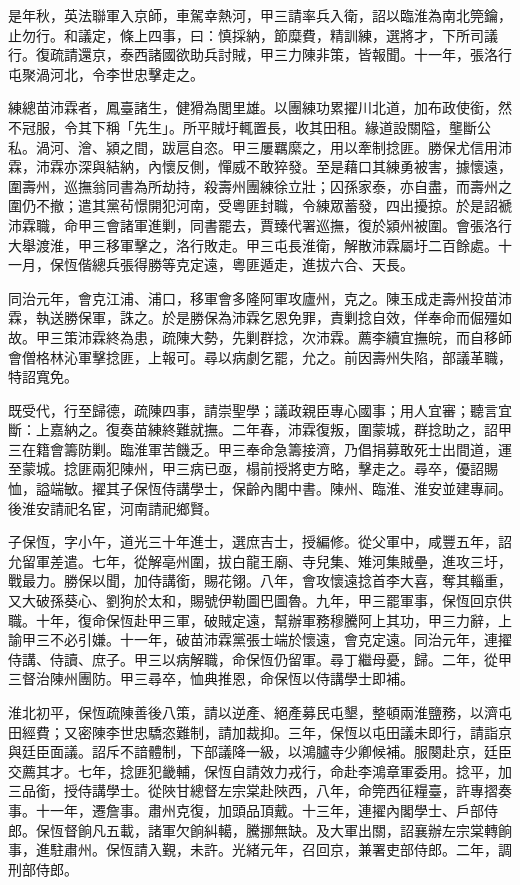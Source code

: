 \begin{pinyinscope}
是年秋，英法聯軍入京師，車駕幸熱河，甲三請率兵入衛，詔以臨淮為南北筦鑰，止勿行。和議定，條上四事，曰：慎採納，節糜費，精訓練，選將才，下所司議行。復疏請還京，泰西諸國欲助兵討賊，甲三力陳非策，皆報聞。十一年，張洛行屯聚渦河北，令李世忠擊走之。

練總苗沛霖者，鳳臺諸生，健猾為閭里雄。以團練功累擢川北道，加布政使銜，然不冠服，令其下稱「先生」。所平賊圩輒置長，收其田租。緣道設關隘，壟斷公私。渦河、澮、潁之間，跋扈自恣。甲三屢羈縻之，用以牽制捻匪。勝保尤信用沛霖，沛霖亦深與結納，內懷反側，憚威不敢猝發。至是藉口其練勇被害，據懷遠，圍壽州，巡撫翁同書為所劫持，殺壽州團練徐立壯；囚孫家泰，亦自盡，而壽州之圍仍不撤；遣其黨茍憬開犯河南，受粵匪封職，令練眾蓄發，四出擾掠。於是詔褫沛霖職，命甲三會諸軍進剿，同書罷去，賈臻代署巡撫，復於潁州被圍。會張洛行大舉渡淮，甲三移軍擊之，洛行敗走。甲三屯長淮衛，解散沛霖屬圩二百餘處。十一月，保恆偕總兵張得勝等克定遠，粵匪遁走，進拔六合、天長。

同治元年，會克江浦、浦口，移軍會多隆阿軍攻廬州，克之。陳玉成走壽州投苗沛霖，執送勝保軍，誅之。於是勝保為沛霖乞恩免罪，責剿捻自效，佯奉命而倔殭如故。甲三策沛霖終為患，疏陳大勢，先剿群捻，次沛霖。薦李續宜撫皖，而自移師會僧格林沁軍擊捻匪，上報可。尋以病劇乞罷，允之。前因壽州失陷，部議革職，特詔寬免。

既受代，行至歸德，疏陳四事，請崇聖學；議政親臣專心國事；用人宜審；聽言宜斷：上嘉納之。復奏苗練終難就撫。二年春，沛霖復叛，圍蒙城，群捻助之，詔甲三在籍會籌防剿。臨淮軍苦饑乏。甲三奉命急籌接濟，乃倡捐募敢死士出間道，運至蒙城。捻匪兩犯陳州，甲三病已亟，榻前授將吏方略，擊走之。尋卒，優詔賜恤，謚端敏。擢其子保恆侍講學士，保齡內閣中書。陳州、臨淮、淮安並建專祠。後淮安請祀名宦，河南請祀鄉賢。

子保恆，字小午，道光三十年進士，選庶吉士，授編修。從父軍中，咸豐五年，詔允留軍差遣。七年，從解亳州圍，拔白龍王廟、寺兒集、雉河集賊壘，進攻三圩，戰最力。勝保以聞，加侍講銜，賜花翎。八年，會攻懷遠捻首李大喜，奪其輜重，又大破孫葵心、劉狗於太和，賜號伊勒圖巴圖魯。九年，甲三罷軍事，保恆回京供職。十年，復命保恆赴甲三軍，破賊定遠，幫辦軍務穆騰阿上其功，甲三力辭，上諭甲三不必引嫌。十一年，破苗沛霖黨張士端於懷遠，會克定遠。同治元年，連擢侍講、侍讀、庶子。甲三以病解職，命保恆仍留軍。尋丁繼母憂，歸。二年，從甲三督治陳州團防。甲三尋卒，恤典推恩，命保恆以侍講學士即補。

淮北初平，保恆疏陳善後八策，請以逆產、絕產募民屯墾，整頓兩淮鹽務，以濟屯田經費；又密陳李世忠驕恣難制，請加裁抑。三年，保恆以屯田議未即行，請詣京與廷臣面議。詔斥不諳體制，下部議降一級，以鴻臚寺少卿候補。服闋赴京，廷臣交薦其才。七年，捻匪犯畿輔，保恆自請效力戎行，命赴李鴻章軍委用。捻平，加三品銜，授侍講學士。從陜甘總督左宗棠赴陜西，八年，命筦西征糧臺，許專摺奏事。十一年，遷詹事。肅州克復，加頭品頂戴。十三年，連擢內閣學士、戶部侍郎。保恆督餉凡五載，諸軍欠餉糾轕，騰挪無缺。及大軍出關，詔襄辦左宗棠轉餉事，進駐肅州。保恆請入覲，未許。光緒元年，召回京，兼署吏部侍郎。二年，調刑部侍郎。


\end{pinyinscope}
